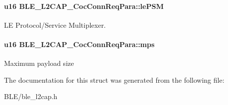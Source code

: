 \paragraph[{\texorpdfstring{le\+P\+SM}{lePSM}}]{\setlength{\rightskip}{0pt plus 5cm}u16 B\+L\+E\+\_\+\+L2\+C\+A\+P\+\_\+\+Coc\+Conn\+Req\+Para\+::le\+P\+SM}\hypertarget{struct_b_l_e___l2_c_a_p___coc_conn_req_para_a7fa7ae295dfb16c1402776ed47943708}{}\label{struct_b_l_e___l2_c_a_p___coc_conn_req_para_a7fa7ae295dfb16c1402776ed47943708}
LE Protocol/\+Service Multiplexer. 
\paragraph[{\texorpdfstring{mps}{mps}}]{\setlength{\rightskip}{0pt plus 5cm}u16 B\+L\+E\+\_\+\+L2\+C\+A\+P\+\_\+\+Coc\+Conn\+Req\+Para\+::mps}\hypertarget{struct_b_l_e___l2_c_a_p___coc_conn_req_para_a5f87d443a26ffe7d2e5be3eb9acf6ead}{}\label{struct_b_l_e___l2_c_a_p___coc_conn_req_para_a5f87d443a26ffe7d2e5be3eb9acf6ead}
Maximum payload size 

The documentation for this struct was generated from the following file\+:\begin{DoxyCompactItemize}
\item 
B\+L\+E/ble\+\_\+l2cap.\+h\end{DoxyCompactItemize}
